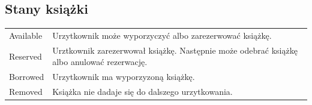 \documentclass[12pt]{article}
\begin{document}
\subsection*{Stany książki}
\begin{table}[!ht]
    \centering
    \begin{tabularx}{1.01\textwidth}{ll}
        \toprule
        Available           & Urzytkownik może wyporzyczyć albo zarezerwować książkę.  \\
        Reserved            & Urztkownik zarezerwował książkę. Następnie może odebrać książkę albo anulować rezerwację. \\
        Borrowed            & Urzytkownik ma wyporzyzoną książkę.  \\
        Removed        &  Książka nie dadaje się do dalszego urzytkowania. \\
        \bottomrule
    \end{tabularx}
\end{table}
\end{document}
